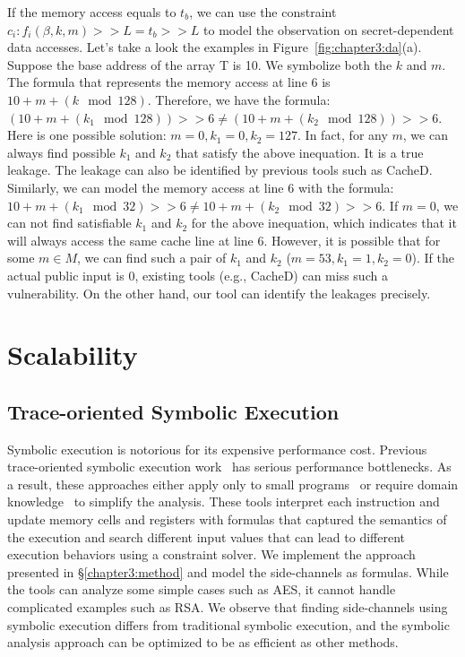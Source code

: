 If the memory access equals to $t_b$, we can use the constraint $c_i :
  f_i(\beta, k, m) >> L = t_b >> L$ to model the observation on secret-dependent
data accesses. Let's take a look the examples in Figure~\ref{fig:chapter3:da}(a).
Suppose the base address of the array \textsf{T} is 10. We symbolize both the $k$ and $m$. The formula that represents the memory access at line 6 is $10 + m + (k \mod 128)$. Therefore, we have the formula: $(10 + m + (k_1 \mod 128)) >> 6  \neq (10 + m + (k_2 \mod 128)) >> 6$.
Here is one possible solution: $m = 0, k_1 = 0, k_2 = 127$. In fact, for any $m$, we can always find possible $k_1$ and $k_2$ that satisfy the above inequation. It is a true leakage. The leakage can also be identified by previous tools such as CacheD. Similarly, we can model the memory access at line 6 with the formula:  $10 + m + (k_1 \mod 32) >> 6  \neq 10 + m + (k_2 \mod 32) >> 6$. If $m = 0$, we can not find satisfiable $k_1$ and $k_2$ for the above inequation, which indicates that it will always access the same cache line at line 6. However, it is possible that for some $m \in M$, we can find such a pair of $k_1$ and $k_2$ ($m = 53, k_1 = 1, k_2 = 0$). If the actual public input is $0$, existing tools (e.g., CacheD) can miss such a vulnerability. On the other hand, our tool can identify the leakages precisely.

\section{Scalability}
\subsection{Trace-oriented Symbolic Execution}
Symbolic execution is notorious for its expensive performance cost.
Previous trace-oriented symbolic execution
work~\cite{203878,Chattopadhyay:2017:QIL:3127041.3127044} has serious
performance bottlenecks. As a result, these approaches either apply only to
small programs~\cite{Chattopadhyay:2017:QIL:3127041.3127044} or require
domain knowledge~\cite{Wang:2007:NCD:1250662.1250723} to simplify the analysis.
These tools interpret each
instruction and update memory cells and registers with formulas that
captured the semantics of the execution and search different input values that
can lead to different execution behaviors using a constraint solver.
We implement the approach presented in \S\ref{chapter3:method} and model the side-channels as formulas. While the tools can analyze some simple cases such as AES, it cannot handle complicated examples such as RSA.
We observe that finding side-channels using symbolic execution differs from
traditional symbolic execution, and the symbolic analysis approach can be optimized to be as efficient
as other methods.

